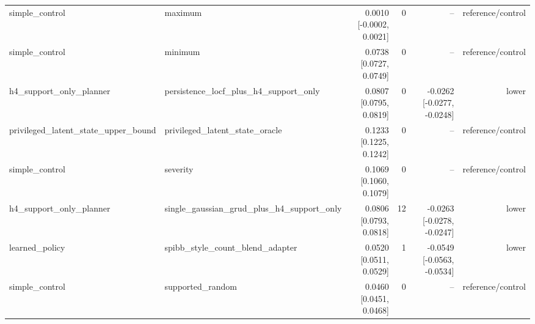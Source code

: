 \begin{table}[t]
\begin{tabular}{llrrrr}
simple\_control & maximum & 0.0010 [-0.0002, 0.0021] & 0 & -- & reference/control \\
simple\_control & minimum & 0.0738 [0.0727, 0.0749] & 0 & -- & reference/control \\
h4\_support\_only\_planner & persistence\_locf\_plus\_h4\_support\_only & 0.0807 [0.0795, 0.0819] & 0 & -0.0262 [-0.0277, -0.0248] & lower \\
privileged\_latent\_state\_upper\_bound & privileged\_latent\_state\_oracle & 0.1233 [0.1225, 0.1242] & 0 & -- & reference/control \\
simple\_control & severity & 0.1069 [0.1060, 0.1079] & 0 & -- & reference/control \\
h4\_support\_only\_planner & single\_gaussian\_grud\_plus\_h4\_support\_only & 0.0806 [0.0793, 0.0818] & 12 & -0.0263 [-0.0278, -0.0247] & lower \\
learned\_policy & spibb\_style\_count\_blend\_adapter & 0.0520 [0.0511, 0.0529] & 1 & -0.0549 [-0.0563, -0.0534] & lower \\
simple\_control & supported\_random & 0.0460 [0.0451, 0.0468] & 0 & -- & reference/control \\
\bottomrule
\end{tabular}
\end{table}
